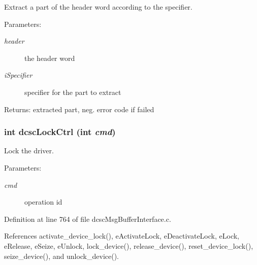 Extract a part of the header word according to the specifier. 

\begin{Desc}
\item[Parameters:]
\begin{description}
\item[{\em header}]the header word \item[{\em i\-Specifier}]specifier for the part to extract \end{description}
\end{Desc}
\begin{Desc}
\item[Returns:]extracted part, neg. error code if failed \end{Desc}
\hypertarget{group__dcsc__msg__buffer__access_gb01774a452cb68f631a87d2d77ac79a5}{
\subsubsection[dcscLockCtrl]{\setlength{\rightskip}{0pt plus 5cm}int dcsc\-Lock\-Ctrl (int {\em cmd})}}
\label{group__dcsc__msg__buffer__access_gb01774a452cb68f631a87d2d77ac79a5}


Lock the driver. 

\begin{Desc}
\item[Parameters:]
\begin{description}
\item[{\em cmd}]operation id \end{description}
\end{Desc}


Definition at line 764 of file dcsc\-Msg\-Buffer\-Interface.c.

References activate\_\-device\_\-lock(), e\-Activate\-Lock, e\-Deactivate\-Lock, e\-Lock, e\-Release, e\-Seize, e\-Unlock, lock\_\-device(), release\_\-device(), reset\_\-device\_\-lock(), seize\_\-device(), and unlock\_\-device().

